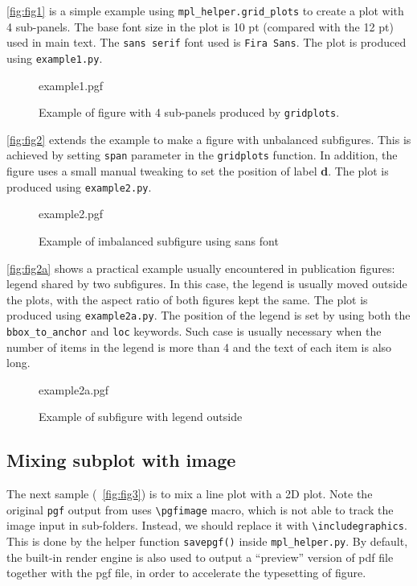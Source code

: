 \autoref{fig:fig1} is a simple example using
\verb|mpl_helper.grid_plots| to create a plot with 4 sub-panels. The
base font size in the plot is 10 pt (compared with the 12 pt) used in
main text. The \texttt{sans serif} font used is \texttt{Fira
  Sans}. The plot is produced using \verb|example1.py|.

\begin{figure}[htbp]
  \centering
  {example1.pgf}
  \caption{Example of figure with 4 sub-panels produced by
    \texttt{gridplots}.}
  \label{fig:fig1}
\end{figure}

\autoref{fig:fig2} extends the example to make a figure with
unbalanced subfigures. This is achieved by setting \texttt{span}
parameter in the \texttt{gridplots} function. In addition, the figure
uses a small manual tweaking to set the position of label
\textbf{\textsf{d}}. The plot is produced using \verb|example2.py|.


\begin{figure}[htbp]
  \centering
  {example2.pgf}
  \caption{Example of imbalanced subfigure using sans font}
  \label{fig:fig2}
\end{figure}

\autoref{fig:fig2a} shows a practical example usually encountered in
publication figures: legend shared by two subfigures. In this case,
the legend is usually moved outside the plots, with the aspect ratio
of both figures kept the same. The plot is produced using
\verb|example2a.py|. The position of the legend is set by using both
the \texttt{bbox\_to\_anchor} and \texttt{loc} keywords. Such case is
usually necessary when the number of items in the legend is more than
4 and the text of each item is also long.

\begin{figure}[htbp]
  \centering
  {example2a.pgf}
  \caption{Example of subfigure with legend outside}
  \label{fig:fig2a}
\end{figure}

\subsection{Mixing subplot with image}
\label{sec:mixing-subplot-with}

The next sample (~\autoref{fig:fig3}) is to mix a line plot with a 2D
plot. Note the original \texttt{pgf} output from \mpl{} uses
\verb|\pgfimage| macro, which is not able to track the image input in
sub-folders. Instead, we should replace it with
\verb|\includegraphics|. This is done by the helper function
\verb|savepgf()| inside \verb|mpl_helper.py|. By default, the built-in
\mpl{} render engine is also used to output a ``preview'' version of
pdf file together with the pgf file, in order to accelerate the
typesetting of figure.

